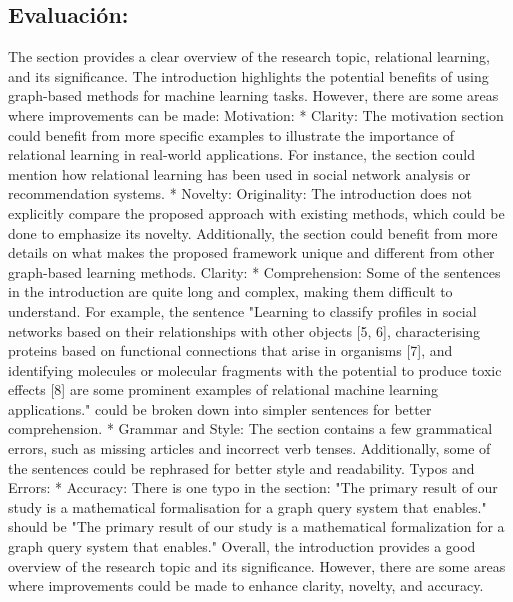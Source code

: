 \documentclass{article}%
\begin{document}
\subsection{Evaluación:}%
\label{subsec:Evaluacin}%
The section provides a clear overview of the research topic, relational learning, and its significance. The introduction highlights the potential benefits of using graph{-}based methods for machine learning tasks. However, there are some areas where improvements can be made:\newline%
\newline%
Motivation:\newline%
\newline%
* Clarity: The motivation section could benefit from more specific examples to illustrate the importance of relational learning in real{-}world applications. For instance, the section could mention how relational learning has been used in social network analysis or recommendation systems.\newline%
* Novelty:\newline%
\newline%
Originality: The introduction does not explicitly compare the proposed approach with existing methods, which could be done to emphasize its novelty. Additionally, the section could benefit from more details on what makes the proposed framework unique and different from other graph{-}based learning methods.\newline%
\newline%
Clarity:\newline%
\newline%
* Comprehension: Some of the sentences in the introduction are quite long and complex, making them difficult to understand. For example, the sentence "Learning to classify profiles in social networks based on their relationships with other objects {[}5, 6{]}, characterising proteins based on functional connections that arise in organisms {[}7{]}, and identifying molecules or molecular fragments with the potential to produce toxic effects {[}8{]} are some prominent examples of relational machine learning applications." could be broken down into simpler sentences for better comprehension.\newline%
* Grammar and Style: The section contains a few grammatical errors, such as missing articles and incorrect verb tenses. Additionally, some of the sentences could be rephrased for better style and readability.\newline%
\newline%
Typos and Errors:\newline%
\newline%
* Accuracy: There is one typo in the section: "The primary result of our study is a mathematical formalisation for a graph query system that enables." should be "The primary result of our study is a mathematical formalization for a graph query system that enables."\newline%
\newline%
Overall, the introduction provides a good overview of the research topic and its significance. However, there are some areas where improvements could be made to enhance clarity, novelty, and accuracy.
\end{document}
